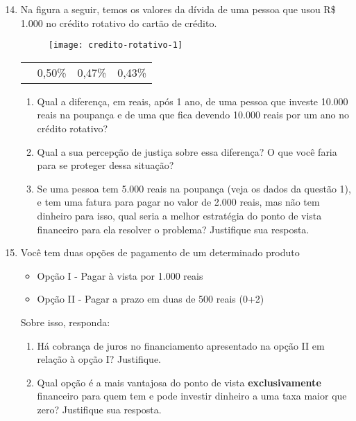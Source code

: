 \begin{enumerate}\setcounter{enumi}{13}
\item Na figura a seguir, temos os valores da dívida de uma pessoa que usou R\$ 1.000 no crédito rotativo do cartão de crédito.

\begin{multicols}{2}

\begin{figure}[H]
\centering

\texttt{[image: credito-rotativo-1]}
\end{figure}
\columnbreak
\null\vfill

\begin{table}[H]
\centering

\begin{tabu} to \textwidth{|c|c|c|c|}
\hhline{~|---|}
 &  &  &  \\
\hline
{} & 0,50\% & 0,47\% & 0,43\% \\
\hline
\end{tabu}
\end{table}
\vfill\null
\end{multicols}

\begin{enumerate}
\item Qual a diferença, em reais, após 1 ano, de uma pessoa que investe 10.000 reais na poupança e de uma que fica devendo 10.000 reais por um ano no crédito rotativo? 
\item Qual a sua percepção de justiça sobre essa diferença? O que você faria para se proteger dessa situação?

\item Se uma pessoa tem 5.000 reais na poupança (veja os dados da questão 1), e tem uma fatura para pagar no valor de 2.000 reais, mas não tem dinheiro para isso, qual seria a melhor estratégia do ponto de vista financeiro para ela resolver o problema? Justifique sua resposta.
\end{enumerate}

\item Você tem duas opções de pagamento de um determinado produto
\begin{itemize}
\item Opção I - Pagar à vista por 1.000 reais
\item Opção II - Pagar a prazo em duas de 500 reais (0+2)
\end{itemize}

Sobre isso, responda:
\begin{enumerate}
\item Há cobrança de juros no financiamento apresentado na opção II em relação à opção I? Justifique.
\item Qual opção é a mais vantajosa do ponto de vista \textbf{exclusivamente} financeiro para quem tem e pode investir dinheiro a uma taxa maior que zero? Justifique sua resposta.
\end{enumerate}
\end{enumerate}
\clearpage

